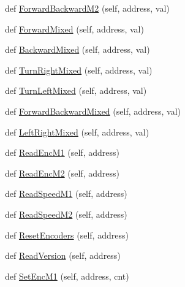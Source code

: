 \begin{DoxyCompactItemize}
\item 
def \mbox{\hyperlink{classtoxic__hardware_1_1roboclaw__3_1_1Roboclaw_ad6306d67157bd2157c6ea1fa77012bb4}{Forward\+Backward\+M2}} (self, address, val)
\item 
def \mbox{\hyperlink{classtoxic__hardware_1_1roboclaw__3_1_1Roboclaw_a3fd878eb1fbefd161f882dace09674eb}{Forward\+Mixed}} (self, address, val)
\item 
def \mbox{\hyperlink{classtoxic__hardware_1_1roboclaw__3_1_1Roboclaw_a54e4de9df31a65db32165fbb4c4cfdce}{Backward\+Mixed}} (self, address, val)
\item 
def \mbox{\hyperlink{classtoxic__hardware_1_1roboclaw__3_1_1Roboclaw_ab492f6d06fdd74bfb935eb106f67c1df}{Turn\+Right\+Mixed}} (self, address, val)
\item 
def \mbox{\hyperlink{classtoxic__hardware_1_1roboclaw__3_1_1Roboclaw_aef1735f64e5a8821ea53e8c2802ed5c1}{Turn\+Left\+Mixed}} (self, address, val)
\item 
def \mbox{\hyperlink{classtoxic__hardware_1_1roboclaw__3_1_1Roboclaw_ac733bf5b66aecf0217c17a361fc19833}{Forward\+Backward\+Mixed}} (self, address, val)
\item 
def \mbox{\hyperlink{classtoxic__hardware_1_1roboclaw__3_1_1Roboclaw_af13532aeabaffc5f8539071a6786dc73}{Left\+Right\+Mixed}} (self, address, val)
\item 
def \mbox{\hyperlink{classtoxic__hardware_1_1roboclaw__3_1_1Roboclaw_a9910a2d9de2c937112ecb54895ac2a15}{Read\+Enc\+M1}} (self, address)
\item 
def \mbox{\hyperlink{classtoxic__hardware_1_1roboclaw__3_1_1Roboclaw_a9b97c9bb14ca132e64c1bdd26d476593}{Read\+Enc\+M2}} (self, address)
\item 
def \mbox{\hyperlink{classtoxic__hardware_1_1roboclaw__3_1_1Roboclaw_ab0c1e59469b147fef685ca5d2dd5cc08}{Read\+Speed\+M1}} (self, address)
\item 
def \mbox{\hyperlink{classtoxic__hardware_1_1roboclaw__3_1_1Roboclaw_a82d0bdbc232ab844d2f413a7bf6f5cc9}{Read\+Speed\+M2}} (self, address)
\item 
def \mbox{\hyperlink{classtoxic__hardware_1_1roboclaw__3_1_1Roboclaw_ada4a23991195ccec05c704e8fbf9f536}{Reset\+Encoders}} (self, address)
\item 
def \mbox{\hyperlink{classtoxic__hardware_1_1roboclaw__3_1_1Roboclaw_ab53d1f17fa69f6c3118eb54fd2ec3954}{Read\+Version}} (self, address)
\item 
def \mbox{\hyperlink{classtoxic__hardware_1_1roboclaw__3_1_1Roboclaw_a51fd7b01037c33d8110a488320345077}{Set\+Enc\+M1}} (self, address, cnt)

\end{DoxyCompactItemize}
